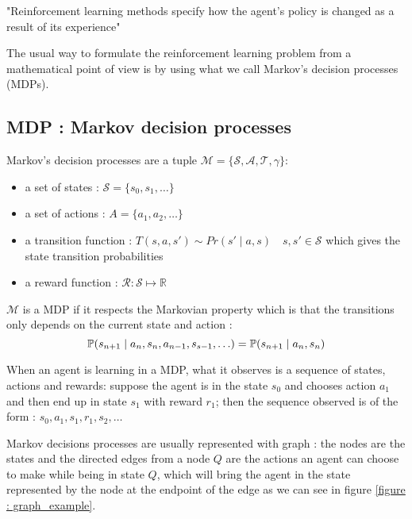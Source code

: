 \documentclass[14pt,a4paper]{article}
\theoremstyle{definition}
\begin{document}
"Reinforcement learning methods specify how the agent's policy is changed as a result of its experience"\cite{Sutton}



The usual way to formulate the reinforcement learning problem from a mathematical point of view is by using what we call Markov's decision processes (MDPs).

\subsection{MDP : Markov decision processes}



Markov's decision processes are a tuple $\mathcal{M}=\{\mathcal{S},\mathcal{A},\mathcal{T},\gamma\}$:\cite{Xia2015}

\begin{itemize}
\item a set of states : $\mathcal{S}=\{s_0,s_1,\ldots\}$
\item a set of actions  : $A=\{a_1,a_2,\ldots \}$
\item a transition function :  $T(s,a,s') \sim  Pr(s'\mid a, s) \quad s,s' \in \mathcal{S}$ which gives the state transition probabilities
\item a reward function : $\mathcal{R}:\mathcal{S}\mapsto \mathbb{R} $
\end{itemize}

$\mathcal{M}$ is a MDP if it respects the Markovian property which is that the transitions only depends on the current state and action : 
\begin{equation}
\mathbb{P}(s_{n+1}\mid a_{n},s_{n},a_{n-1},s_{s-1},\ldots)=\mathbb{P}(s_{n+1}\mid a_{n},s_{n})\\
\end{equation}

When an agent is learning in a MDP, what it observes is a sequence of states, actions and rewards: suppose the agent is in the state $s_0$ and chooses action $a_1$ and then end up in state $s_1$ with reward $r_1$; then the sequence observed is of the form : $s_0,a_1,s_1,r_1,s_2,\ldots$

Markov decisions processes are usually represented with graph : the nodes are the states and the directed edges from a node $Q$ are the actions an agent can choose to make while being in state $Q$, which will bring the agent in the state represented by the node at the endpoint of the edge as we can see in figure \ref{figure : graph_example}.
\end{document}
